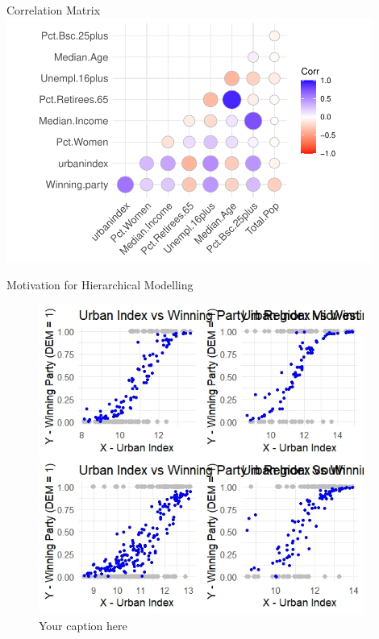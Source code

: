 \documentclass{beamer}
\begin{document}
\begin{frame}{Correlation Matrix}
    \includegraphics[width=0.9\textwidth]{plots/corrplot.pdf}
\end{frame}

\begin{frame}{Motivation for Hierarchical Modelling}
    \begin{figure}
    \centering
    \includegraphics[width=0.95\textwidth]{plots/motivation_groupwise_scatterplot.jpeg} %
    \caption{Your caption here}
\end{figure}

\end{frame}
\end{document}
